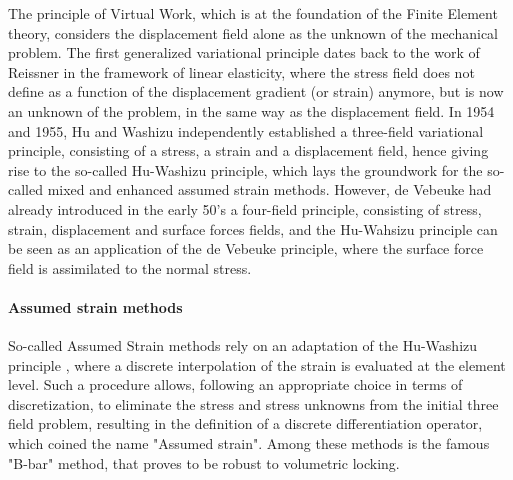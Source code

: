 
The principle of Virtual Work, which is at the foundation of the Finite Element theory, considers the displacement field alone as the unknown of the mechanical problem.
The first generalized variational principle dates back to the work of Reissner \cite{reissner_variational_1950} in the framework of linear elasticity, where the stress field does
not define as a function of the displacement gradient (or strain) anymore, but is now an unknown of the problem, in the same way as the displacement field.
In 1954 and 1955, Hu \cite{hu_variational_1954} and Washizu \cite{washizu_variational_1955} independently established a three-field variational principle, consisting of a stress,
a strain and a displacement field, hence giving rise to the so-called Hu-Washizu principle, which lays the groundwork for the so-called mixed and enhanced assumed strain methods.
However, de Vebeuke had already introduced in the early 50's a four-field principle, consisting of stress, strain, displacement and surface forces fields, and the Hu-Wahsizu principle
can be seen as an application of the de Vebeuke principle, where the surface force field is assimilated to the normal stress.

\paragraph{Assumed strain methods}

So-called Assumed Strain methods rely on an adaptation of the Hu-Washizu principle \cite{simo_variational_1985}, where a discrete interpolation of the strain is evaluated at the element level. Such a procedure allows,
following an appropriate choice in terms of discretization, to eliminate the stress and stress unknowns from the initial three field problem, resulting in the definition of a discrete differentiation operator,
which coined the name "Assumed strain". Among these methods is the famous "B-bar" method, that proves to be robust to volumetric locking.

